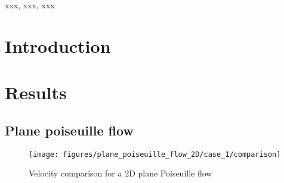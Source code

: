 \documentclass[preprint,12pt]{elsarticle}
\begin{document}
\begin{frontmatter}

  \title{}
  \author[XXX]{Dinesh Adepu}
  \author[XXX]{Pawan Negi }
  \author[University of Surrey]{Chuan Yu Wu}
\address[xxx]{xxx}



\begin{abstract}

\end{abstract}

\begin{keyword}
{xxx}, {xxx}, {xxx}


\end{keyword}

\end{frontmatter}


\section{Introduction}
\label{sec:intro}



\FloatBarrier%
\section{Results}
\label{sec:results}


\FloatBarrier%
\subsection{Plane poiseuille flow}
\label{sec:res:ppf}

\begin{figure}[!htpb]
  \centering
  \texttt{[image: figures/plane\_poiseuille\_flow\_2D/case\_1/comparison]}
  \caption{Velocity comparison for a 2D plane Poiseuille flow}
\label{fig:plane_poiseuille_flow_2D-case_1-comparison}
\end{figure}

\end{document}
